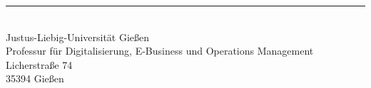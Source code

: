 \begin{titlepage}
\begin{center}
		
		\rule{\textwidth}{.4pt}\\ %
		Justus-Liebig-Universität Gießen\\
		Professur für Digitalisierung, E-Business und Operations Management\\
		Licherstraße 74 \\
		35394  Gießen\\
	\end{center}
	
\end{titlepage} %

